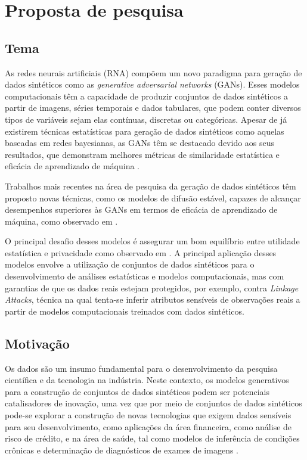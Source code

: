 \chapter{Proposta de pesquisa}

\section{Tema}

As redes neurais artificiais (RNA) compõem um novo paradigma para geração de dados sintéticos como as \textit{generative adversarial networks} (GANs). Esses modelos computacionais têm a capacidade de produzir conjuntos de dados sintéticos a partir de imagens, séries temporais e dados tabulares, que podem conter diversos tipos de variáveis sejam elas contínuas, discretas ou categóricas. Apesar de já existirem técnicas estatísticas para geração de dados sintéticos como aquelas baseadas em redes bayesianas, as GANs têm se destacado devido aos seus resultados, que demonstram melhores métricas de similaridade estatística e eficácia de aprendizado de máquina \cite{xu2019}.

Trabalhos mais recentes na área de pesquisa da geração de dados sintéticos têm proposto novas técnicas, como os modelos de difusão estável, capazes de alcançar desempenhos superiores às GANs em termos de eficácia de aprendizado de máquina, como observado em .

O principal desafio desses modelos é assegurar um bom equilíbrio entre utilidade estatística e privacidade como observado em . A principal aplicação desses modelos envolve a utilização de conjuntos de dados sintéticos para o desenvolvimento de análises estatísticas e modelos computacionais, mas com garantias de que os dados reais estejam protegidos, por exemplo, contra \textit{Linkage Attacks}, técnica na qual tenta-se inferir atributos sensíveis de observações reais a partir de modelos computacionais treinados com dados sintéticos.


\section{Motivação}

Os dados são um insumo fundamental para o desenvolvimento da pesquisa científica e da tecnologia na indústria. Neste contexto, os modelos generativos para a construção de conjuntos de dados sintéticos podem ser potenciais catalisadores de inovação, uma vez que por meio de conjuntos de dados sintéticos pode-se explorar a construção de novas tecnologias que exigem dados sensíveis para seu desenvolvimento, como aplicações da área financeira, como análise de risco de crédito, e na área de saúde, tal como modelos de inferência de condições crônicas e determinação de diagnósticos de exames de imagens \cite{review2022}.

